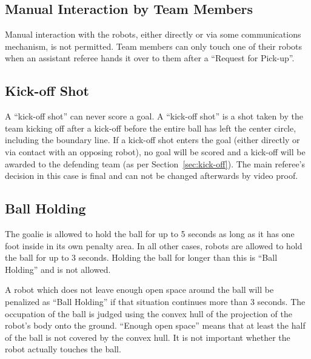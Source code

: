\documentclass[12pt]{article}
\begin{document}
\subsection{Manual Interaction by Team Members}

Manual interaction with the robots, either directly or via some communications mechanism, is not permitted. Team members can only touch one of their robots when an assistant referee hands it over to them after a ``Request for Pick-up''.

\subsection{Kick-off Shot}
\label{sec:kick-off_shot}

A ``kick-off shot'' can never score a goal. A ``kick-off shot'' is a shot taken by the team kicking off after a kick-off before the entire ball has left the center circle, including the boundary line. 
If a kick-off shot enters the goal (either directly or via contact with an opposing robot), no goal will be scored and a kick-off will be awarded to the defending team (as per Section~\ref{sec:kick-off}).
The main referee's decision in this case is final and can not be changed afterwards by video proof.

\subsection{Ball Holding}
\label{sec:ball_holding}

The goalie is allowed to hold the ball for up to 5 seconds as long as it has one foot inside in its own penalty area. In all other cases, robots are allowed to hold the ball for up to 3 seconds. Holding the ball for longer than this is ``Ball Holding'' and is not allowed.

A robot which does not leave enough open space around the ball will be penalized as ``Ball Holding'' if that situation continues more than 3 seconds. The occupation of the ball is judged using the convex hull of the projection of the robot's body onto the ground. ``Enough open space'' means that at least the half of the ball is not covered by the convex hull. It is not important whether the robot actually touches the ball.
\end{document}
